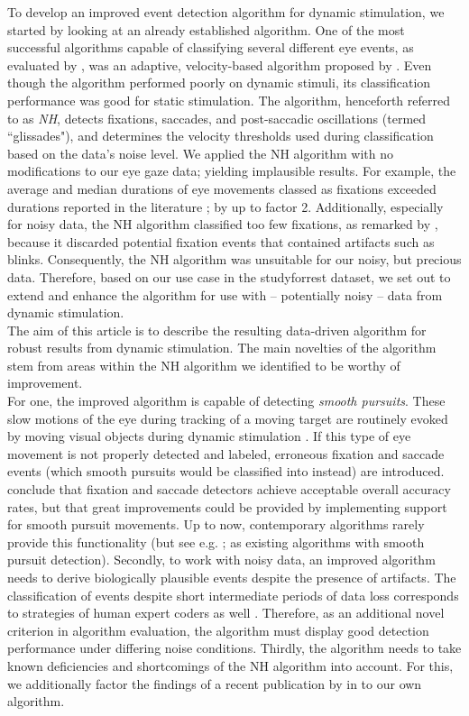 To develop an improved event detection algorithm for dynamic stimulation, we started by looking at an already established algorithm. One of the most successful algorithms capable of classifying several different eye events, as evaluated by \citet{Andersson2017}, was an adaptive, velocity-based algorithm proposed by \citet{Nystrom2010AnData}. Even though the algorithm performed poorly on dynamic stimuli, its classification performance was good for static stimulation. The algorithm, henceforth referred to as \textit{NH}, detects fixations, saccades, and post-saccadic oscillations (termed ``glissades"), and determines the velocity thresholds used during classification based on the data's noise level. We applied the NH algorithm with no modifications to our eye gaze data; yielding implausible results. For example, the average and median durations of eye movements classed as fixations exceeded durations reported in the literature \citep{holmqvist2011eye,dorr2010variability};
by up to factor 2. Additionally, especially for noisy data, the NH algorithm classified too few fixations, as remarked by \citet{Friedman2018}, because it discarded potential fixation events that contained artifacts such as blinks. Consequently, the NH algorithm was unsuitable for our noisy, but precious data. Therefore, based on our use case in the studyforrest dataset, we set out to extend and enhance the algorithm for use with -- potentially noisy -- data from dynamic stimulation. \\
The aim of this article is to describe the resulting data-driven algorithm for robust results from dynamic stimulation. The main novelties of the algorithm stem from areas within the NH algorithm we identified to be worthy of improvement. \\
For one, the improved algorithm is capable of detecting \textit{smooth pursuits}. These slow motions of the eye during tracking of a moving target are routinely evoked by moving visual objects during dynamic stimulation \citep{carl1987pursuits}. If this type of eye movement is not properly detected and labeled, erroneous fixation and saccade events (which smooth pursuits would be classified into instead)  are introduced. \cite{Andersson2017} conclude that fixation and saccade detectors achieve acceptable overall accuracy rates, but that great improvements could be provided by implementing support for smooth pursuit movements. Up to now, contemporary algorithms rarely provide this functionality (but see e.g. \cite{LARSSON2015145}; \cite{Komogortsev2013} as existing algorithms with smooth pursuit detection). Secondly, to work with noisy data, an improved algorithm needs to derive biologically plausible events despite the presence of artifacts. The classification of events despite short intermediate periods of data loss corresponds to strategies of human expert coders as well \citep{Hooge2018}. Therefore, as an additional novel criterion in algorithm evaluation, the algorithm must display good detection performance under differing noise conditions. Thirdly, the algorithm needs to take known deficiencies and shortcomings of the NH algorithm into account. For this, we additionally factor the findings of a recent publication by \cite{Friedman2018} in to our own algorithm. \\
